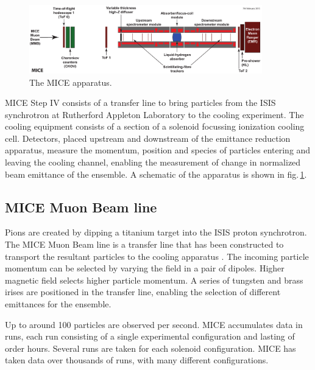 \begin{figure}[!tbh]
    \includegraphics*[width=0.9\textwidth]{01-Introduction/Figures/Step-4-labels.pdf}
    \caption{The MICE apparatus. \label{fig:Step4}}
\end{figure}

MICE Step IV  \cite{mice} \cite{mice_step_iv} consists of a transfer line to 
bring particles from the ISIS synchrotron at Rutherford Appleton Laboratory to 
the cooling experiment.  The cooling equipment consists of a section of a 
solenoid focussing ionization cooling cell. Detectors, placed upstream and 
downstream of the emittance reduction apparatus, measure the momentum, position 
and species of particles entering and leaving the cooling channel, enabling the 
measurement of change in normalized beam emittance of the ensemble.
A schematic of the apparatus is shown in fig.\,\ref{fig:Step4}.

\subsection{MICE Muon Beam line}
Pions are created by dipping a titanium target into the ISIS proton synchrotron. 
The MICE Muon Beam line is a  transfer line that has been constructed to 
transport the resultant 
particles to the cooling apparatus \cite{beamline} \cite{pion_contamination} 
\cite{characterization}.  The incoming particle momentum can be selected by 
varying the field in a pair of dipoles. Higher magnetic field selects higher 
particle momentum. A series of tungsten and brass irises are positioned in the 
transfer line, enabling the selection of different emittances for the ensemble.

Up to around 100 particles are observed per second. MICE accumulates data in 
runs, each run consisting of a single experimental configuration and lasting of 
order hours. Several runs are taken for each solenoid configuration.  MICE has 
taken data over thousands of runs, with many different configurations.

